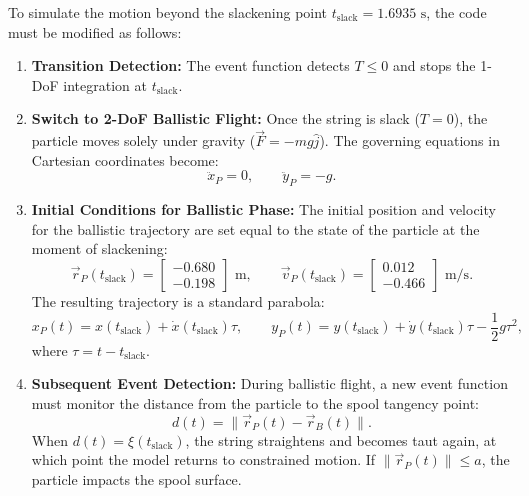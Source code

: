\documentclass[11pt,a4paper]{article}
\begin{document}
To simulate the motion beyond the slackening point $t_{\text{slack}} = 1.6935\text{ s}$, the code must be modified as follows:
\begin{enumerate}
    \item \textbf{Transition Detection:} The event function detects $T \le 0$ and stops the 1-DoF integration at $t_{\text{slack}}$.
    \item \textbf{Switch to 2-DoF Ballistic Flight:} Once the string is slack ($T = 0$), the particle moves solely under gravity ($\vec{F} = -mg\hat{j}$). The governing equations in Cartesian coordinates become:
    \begin{equation}
        \ddot{x}_P = 0, \qquad \ddot{y}_P = -g.
    \end{equation}
    \item \textbf{Initial Conditions for Ballistic Phase:} The initial position and velocity for the ballistic trajectory are set equal to the state of the particle at the moment of slackening:
    \begin{equation}
        \vec{r}_P(t_{\text{slack}}) = \begin{bmatrix} -0.680 \\ -0.198 \end{bmatrix}\text{ m}, \qquad \vec{v}_P(t_{\text{slack}}) = \begin{bmatrix} 0.012 \\ -0.466 \end{bmatrix}\text{ m/s}.
    \end{equation}
    The resulting trajectory is a standard parabola:
    \begin{equation}
        x_P(t) = x(t_{\text{slack}}) + \dot{x}(t_{\text{slack}})\tau, \qquad y_P(t) = y(t_{\text{slack}}) + \dot{y}(t_{\text{slack}})\tau - \frac{1}{2}g\tau^2,
    \end{equation}
    where $\tau = t - t_{\text{slack}}$.
    \item \textbf{Subsequent Event Detection:} During ballistic flight, a new event function must monitor the distance from the particle to the spool tangency point:
    \begin{equation}
        d(t) = \|\vec{r}_P(t) - \vec{r}_B(t)\|.
    \end{equation}
    When $d(t) = \xi(t_{\text{slack}})$, the string straightens and becomes taut again, at which point the model returns to constrained motion. If $\|\vec{r}_P(t)\| \le a$, the particle impacts the spool surface.
\end{enumerate}
\end{document}

